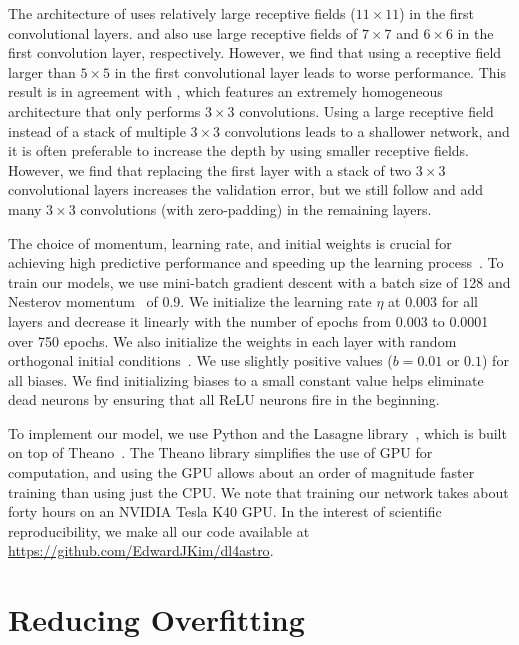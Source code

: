 \documentclass[fleqn,usenatbib]{mnras}
\begin{document}
The architecture of \cite{krizhevsky2012imagenet}
uses relatively large receptive fields ($11\times11$) in the first convolutional layers.
\citet{zeiler2014visualizing} and \cite{dieleman2015rotation}
also use large receptive fields of $7\times7$ and $6\times6$
in the first convolution layer, respectively.
However, we find that using a receptive field larger than $5\times5$ in the first
convolutional layer leads to worse performance.
This result is in agreement with \citet{simonyan2014very},
which features an extremely homogeneous architecture that only performs
$3\times3$ convolutions.
Using a large receptive field instead of a stack of multiple $3\times3$ convolutions
leads to a shallower network, and it is often preferable to increase
the depth by using smaller receptive fields.
However, we find that replacing the first layer with
a stack of two $3\times3$ convolutional layers increases the validation error,
but we still follow \citet{simonyan2014very} and add many
$3\times3$ convolutions (with zero-padding) in the remaining layers.


The choice of momentum, learning rate, and initial weights is crucial
for achieving high predictive performance and speeding up the learning
process~\citep{sutskever2013importance}.
To train our models, we use mini-batch gradient descent with a batch size of 128
and Nesterov momentum~\citep{bengio2013advances} of 0.9.
We initialize the learning rate $\eta$ at 0.003 for all layers and
decrease it linearly with the number of epochs 
from 0.003 to 0.0001 over 750 epochs.
We also initialize the weights in each layer with random orthogonal initial 
conditions~\citep{saxe2013exact}.
We use slightly positive values ($b=0.01$ or $0.1$) for all biases.
We find initializing biases to a small constant value helps eliminate dead neurons
by ensuring that all ReLU neurons fire in the beginning.

To implement our model, we use Python and the Lasagne
library~\citep{dieleman2015lasagne}, which is built on top of
Theano~\citep{theano2016theano}.
The Theano library simplifies the use of GPU for computation, and using the GPU
allows about an order of magnitude faster training than using just the CPU.
We note that training our network takes about forty hours on an NVIDIA Tesla
K40 GPU.
In the interest of scientific reproducibility, we make all our code available
at \href{https://github.com/EdwardJKim/dl4astro}{https://github.com/EdwardJKim/dl4astro}.


\section{Reducing Overfitting}
  \label{sec:overfitting}
  
\end{document}
